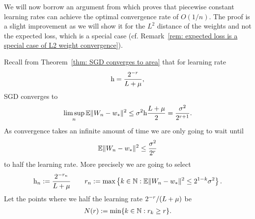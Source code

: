 We will now borrow an argument from \textcite[pp. 27-28]{bottouOptimizationMethodsLargeScale2018}
which proves that piecewise constant learning rates can achieve the optimal
convergence rate of \(O(1/n)\). The proof is a slight improvement as we will
show it for the \(L^2\) distance of the weights and not the expected loss, which
is a special case (cf.  Remark~\ref{rem: expected loss is a special case of L2
weight convergence}).

Recall from Theorem~\ref{thm: SGD converges to area} that for learning rate
\begin{align*}
	\text{h} = \frac{2^{-r}}{L+\mu},
\end{align*}
SGD converges to
\begin{align*}
	\limsup_{n}\mathbb{E}\|W_n - w_*\|^2
	\le \sigma^2 \text{h} \frac{L+\mu}{2} = \frac{\sigma^2}{2^{r+1}}.
\end{align*}
As convergence takes an infinite amount of time we are only going to wait until
\begin{align*}
	\mathbb{E}\|W_n -w_*\|^2 \le \frac{\sigma^2}{2^r}
\end{align*}
to half the learning rate. More precisely we are going to select 
\begin{align}\label{eq: piecewise constant learning rates}
	\text{h}_n := \frac{2^{-r_n}}{L+\mu}
	\qquad	
	r_n := \max\left\{k\in\mathbb{N} : \mathbb{E}\|W_n-w_*\|^2 \le 2^{1-k}\sigma^2\right\}.
\end{align}
Let the points where we half the learning rate
\(2^{-r}/(L+\mu)\) be 
\begin{align*}
	N(r) := \min\{k\in\mathbb{N} : r_k \ge r\}.
\end{align*}

